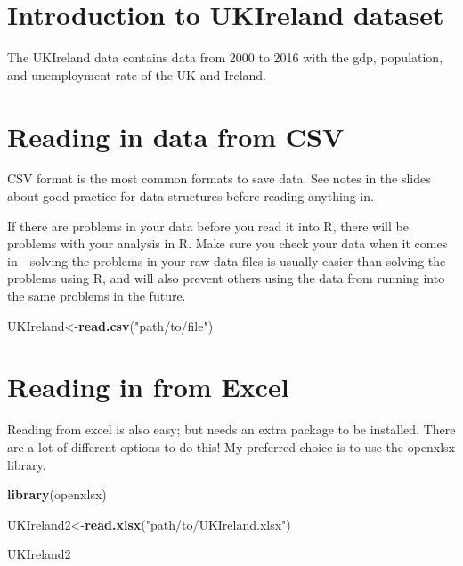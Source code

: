 \documentclass[]{book}
\newenvironment{Shaded}{\begin{snugshade}}{\end{snugshade}}
\newcommand{\KeywordTok}[1]{\textcolor[rgb]{0.13,0.29,0.53}{\textbf{#1}}}
\newcommand{\NormalTok}[1]{#1}
\newcommand{\StringTok}[1]{\textcolor[rgb]{0.31,0.60,0.02}{#1}}
\begin{document}
\hypertarget{introduction-to-ukireland-dataset}{%
\section{Introduction to UKIreland dataset}\label{introduction-to-ukireland-dataset}}

The UKIreland data contains data from 2000 to 2016 with the gdp, population, and unemployment rate of the UK and Ireland. \citep{Livestock}

\hypertarget{reading-in-data-from-csv}{%
\section{Reading in data from CSV}\label{reading-in-data-from-csv}}

CSV format is the most common formats to save data. See notes in the slides about good practice for data structures before reading anything in.

If there are problems in your data before you read it into R, there will be problems with your analysis in R. Make sure you check your data when it comes in - solving the problems in your raw data files is usually easier than solving the problems using R, and will also prevent others using the data from running into the same problems in the future.

\begin{Shaded}
\begin{Highlighting}[]
\NormalTok{UKIreland<-}\KeywordTok{read.csv}\NormalTok{(}\StringTok{"path/to/file"}\NormalTok{)}
\end{Highlighting}
\end{Shaded}

\hypertarget{reading-in-from-excel}{%
\section{Reading in from Excel}\label{reading-in-from-excel}}

Reading from excel is also easy; but needs an extra package to be installed. There are a lot of different options to do this!
My preferred choice is to use the openxlsx library.

\begin{Shaded}
\begin{Highlighting}[]
\KeywordTok{library}\NormalTok{(openxlsx)}

\NormalTok{UKIreland2<-}\KeywordTok{read.xlsx}\NormalTok{(}\StringTok{"path/to/UKIreland.xlsx"}\NormalTok{)}

\NormalTok{UKIreland2}
\end{Highlighting}
\end{Shaded}
\end{document}
